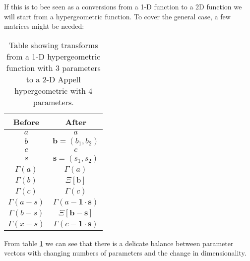 \documentclass[journal=jcisd8,manuscript=article,layout=onecolumn,pdftex,floatfix,amsmath,amssymb,10pt]{achemso}
\begin{document}
If this is to bee seen as a conversions from a 1-D function to a 2D function we will start from a hypergeometric function. To cover the general case, a few matrices might be needed:
\begin{table}
\begin{tabular}{|c|c|}
\hline
Before & After \\
\hline
$a$ & $a$ \\
$b$ & $\mathbf{b}=(b_1,b_2)$ \\
$c$ & $c$ \\
$s$ & $\mathbf{s} = (s_1,s_2)$ \\
\hline
$\Gamma(a)$ & $\Gamma(a)$\\
$\Gamma(b)$ & $\Xi[\mathrm{b}]$ \\
$\Gamma(c)$ & $\Gamma(c)$\\
\hline
$\Gamma(a-s)$ & $\Gamma(a - \mathbf{1}\cdot\mathbf{s})$\\
$\Gamma(b-s)$ & $\Xi[\mathbf{b-s}]$ \\
$\Gamma(x-s)$ & $\Gamma(c - \mathbf{1}\cdot\mathbf{s})$\\
\hline
\end{tabular}
\caption{Table showing transforms from a 1-D hypergeometric function with $3$ parameters to a 2-D Appell hypergeometric with $4$ parameters. }
\label{tab:1dto2d}
\end{table}

From table \ref{tab:1dto2d} we can see that there is a delicate balance between parameter vectors with changing numbers of parameters and the change in dimensionality.
\end{document}
